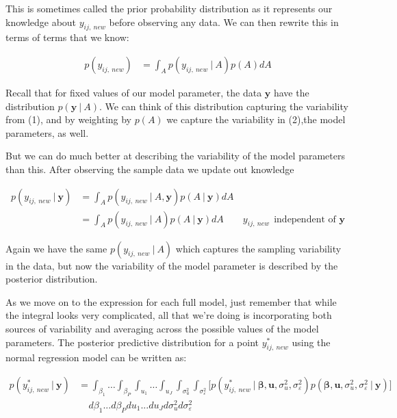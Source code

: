 \documentclass[12pt,twoside]{reedthesis}
\begin{document}
This is sometimes called the prior probability distribution as it represents our knowledge about \(y_{ij, \ new}\) before observing any data. We can then rewrite this in terms of terms that we know:

\[
\begin{aligned}
p(y_{ij, \ new} ) &=\int_A p(y_{ij, \ new} \ | \ A)p(A )dA  
\end{aligned}
\]

Recall that for fixed values of our model parameter, the data \(\mathbf{y}\) have the distribution \(p(\mathbf{y} \ | \ A)\). We can think of this distribution capturing the variability from (1), and by weighting by \(p(A)\) we capture the variability in (2),the model parameters, as well.

But we can do much better at describing the variability of the model parameters than this. After observing the sample data we update out knowledge

\[
\begin{aligned}
p(y_{ij, \ new} \ | \ \mathbf{y}) &=\int_A p(y_{ij, \ new} \ | \ A, \mathbf{y})p(A \ | \ \mathbf{y})dA  \\
&= \int_A p(y_{ij, \ new} \ | \ A)p(A \ | \ \mathbf{y})dA \qquad y_{ij, \ new} \ \  \text{independent of } \mathbf{y}
\end{aligned}
\]

Again we have the same \(p(y_{ij, \ new} \ | \ A)\) which captures the sampling variability in the data, but now the variability of the model parameter is described by the posterior distribution.

As we move on to the expression for each full model, just remember that while the integral looks very complicated, all that we're doing is incorporating both sources of variability and averaging across the possible values of the model parameters. The posterior predictive distribution for a point \(y^*_{ij, \ new}\) using the normal regression model can be written as:

\[
\begin{aligned}
p(y^*_{ij, \ new} \ | \ \mathbf{y}) &=  \int_{\beta_1}  \dots \int_{\beta_P} \int_{u_1} \dots \int_{u_J} \int_{\sigma_u^2} \int_{\sigma_{\varepsilon}^2} \bigg[p(y^*_{ij, \ new} \ | \ \boldsymbol{\beta}, \boldsymbol{u}, \sigma_u^2, \sigma_{\varepsilon}^2)p(\boldsymbol{\beta}, \mathbf{u}, \sigma_u^2, \sigma_{\varepsilon}^2 \ | \ \mathbf{y})\bigg] \\
& \ \ \ \ \ d\beta_1 ...  d\beta_Pdu_1...du_Jd\sigma_u^2d\sigma_{\varepsilon}^2
\end{aligned}
\]
\end{document}
